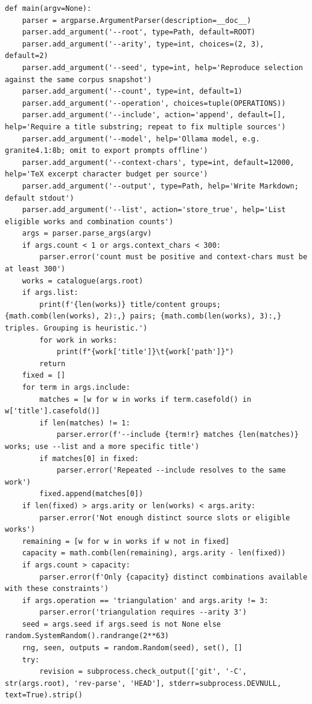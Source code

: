 \documentclass[11pt]{article}
\begin{document}
\begin{lstlisting}
def main(argv=None):
    parser = argparse.ArgumentParser(description=__doc__)
    parser.add_argument('--root', type=Path, default=ROOT)
    parser.add_argument('--arity', type=int, choices=(2, 3), default=2)
    parser.add_argument('--seed', type=int, help='Reproduce selection against the same corpus snapshot')
    parser.add_argument('--count', type=int, default=1)
    parser.add_argument('--operation', choices=tuple(OPERATIONS))
    parser.add_argument('--include', action='append', default=[], help='Require a title substring; repeat to fix multiple sources')
    parser.add_argument('--model', help='Ollama model, e.g. granite4.1:8b; omit to export prompts offline')
    parser.add_argument('--context-chars', type=int, default=12000, help='TeX excerpt character budget per source')
    parser.add_argument('--output', type=Path, help='Write Markdown; default stdout')
    parser.add_argument('--list', action='store_true', help='List eligible works and combination counts')
    args = parser.parse_args(argv)
    if args.count < 1 or args.context_chars < 300:
        parser.error('count must be positive and context-chars must be at least 300')
    works = catalogue(args.root)
    if args.list:
        print(f'{len(works)} title/content groups; {math.comb(len(works), 2):,} pairs; {math.comb(len(works), 3):,} triples. Grouping is heuristic.')
        for work in works:
            print(f"{work['title']}\t{work['path']}")
        return
    fixed = []
    for term in args.include:
        matches = [w for w in works if term.casefold() in w['title'].casefold()]
        if len(matches) != 1:
            parser.error(f'--include {term!r} matches {len(matches)} works; use --list and a more specific title')
        if matches[0] in fixed:
            parser.error('Repeated --include resolves to the same work')
        fixed.append(matches[0])
    if len(fixed) > args.arity or len(works) < args.arity:
        parser.error('Not enough distinct source slots or eligible works')
    remaining = [w for w in works if w not in fixed]
    capacity = math.comb(len(remaining), args.arity - len(fixed))
    if args.count > capacity:
        parser.error(f'Only {capacity} distinct combinations available with these constraints')
    if args.operation == 'triangulation' and args.arity != 3:
        parser.error('triangulation requires --arity 3')
    seed = args.seed if args.seed is not None else random.SystemRandom().randrange(2**63)
    rng, seen, outputs = random.Random(seed), set(), []
    try:
        revision = subprocess.check_output(['git', '-C', str(args.root), 'rev-parse', 'HEAD'], stderr=subprocess.DEVNULL, text=True).strip()

\end{lstlisting}
\end{document}
